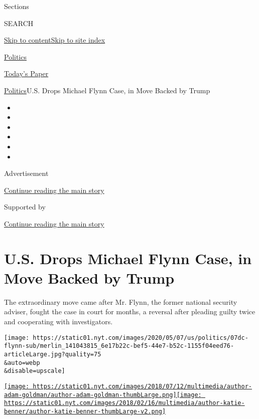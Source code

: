 Sections

SEARCH

\protect\hyperlink{site-content}{Skip to
content}\protect\hyperlink{site-index}{Skip to site index}

\href{https://www.nytimes.com/section/politics}{Politics}

\href{https://myaccount.nytimes.com/auth/login?response_type=cookie\&client_id=vi}{}

\href{https://www.nytimes.com/section/todayspaper}{Today's Paper}

\href{/section/politics}{Politics}\textbar{}U.S. Drops Michael Flynn
Case, in Move Backed by Trump

\begin{itemize}
\item
\item
\item
\item
\item
\item
\end{itemize}

Advertisement

\protect\hyperlink{after-top}{Continue reading the main story}

Supported by

\protect\hyperlink{after-sponsor}{Continue reading the main story}

\hypertarget{us-drops-michael-flynn-case-in-move-backed-by-trump}{%
\section{U.S. Drops Michael Flynn Case, in Move Backed by
Trump}\label{us-drops-michael-flynn-case-in-move-backed-by-trump}}

The extraordinary move came after Mr. Flynn, the former national
security adviser, fought the case in court for months, a reversal after
pleading guilty twice and cooperating with investigators.

\texttt{[image: https://static01.nyt.com/images/2020/05/07/us/politics/07dc-flynn-sub/merlin\_141043815\_6e17b22c-bef5-44e7-b52c-1155f04eed76-articleLarge.jpg?quality=75\\\&auto=webp\\\&disable=upscale]}

\href{https://www.nytimes.com/by/adam-goldman}{\texttt{[image: https://static01.nyt.com/images/2018/07/12/multimedia/author-adam-goldman/author-adam-goldman-thumbLarge.png]}}\href{https://www.nytimes.com/by/katie-benner}{\texttt{[image: https://static01.nyt.com/images/2018/02/16/multimedia/author-katie-benner/author-katie-benner-thumbLarge-v2.png]}}

